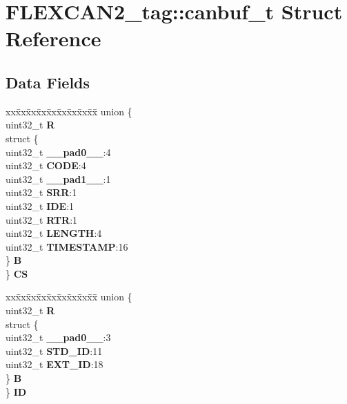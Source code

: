 \hypertarget{structFLEXCAN2__tag_1_1canbuf__t}{}\section{F\+L\+E\+X\+C\+A\+N2\+\_\+tag\+::canbuf\+\_\+t Struct Reference}
\label{structFLEXCAN2__tag_1_1canbuf__t}
\subsection*{Data Fields}
\begin{DoxyCompactItemize}
\item 
\mbox{\label{structFLEXCAN2__tag_1_1canbuf__t_aecbd6a52b663bd0195be149ee37281f6}} 
\begin{tabbing}
xx\=xx\=xx\=xx\=xx\=xx\=xx\=xx\=xx\=\kill
union \{\\
\>uint32\_t {\bfseries R}\\
\>struct \{\\
\>\>uint32\_t {\bfseries \_\_pad0\_\_}:4\\
\>\>uint32\_t {\bfseries CODE}:4\\
\>\>uint32\_t {\bfseries \_\_pad1\_\_}:1\\
\>\>uint32\_t {\bfseries SRR}:1\\
\>\>uint32\_t {\bfseries IDE}:1\\
\>\>uint32\_t {\bfseries RTR}:1\\
\>\>uint32\_t {\bfseries LENGTH}:4\\
\>\>uint32\_t {\bfseries TIMESTAMP}:16\\
\>\} {\bfseries B}\\
\} {\bfseries CS}\\

\end{tabbing}\item 
\mbox{\label{structFLEXCAN2__tag_1_1canbuf__t_a15323860b0a730603ea64beac6cc9e0d}} 
\begin{tabbing}
xx\=xx\=xx\=xx\=xx\=xx\=xx\=xx\=xx\=\kill
union \{\\
\>uint32\_t {\bfseries R}\\
\>struct \{\\
\>\>uint32\_t {\bfseries \_\_pad0\_\_}:3\\
\>\>uint32\_t {\bfseries STD\_ID}:11\\
\>\>uint32\_t {\bfseries EXT\_ID}:18\\
\>\} {\bfseries B}\\
\} {\bfseries ID}\\


\end{tabbing}
\end{DoxyCompactItemize}
